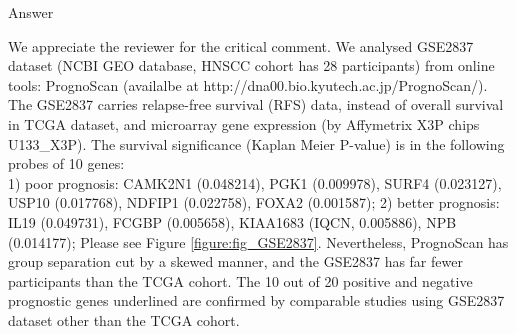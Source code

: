 \documentclass[preprint,12pt]{elsarticle}
\newenvironment{MyColorPar}[1]{%
    \leavevmode\color{#1}\ignorespaces%
}{%
}%
\begin{document}
\begin{MyColorPar}{blue}
Answer

We appreciate the reviewer for the critical comment.
We analysed GSE2837 dataset (NCBI GEO database\cite{Chung2006}, HNSCC cohort has 28 participants) from online tools: PrognoScan (availalbe at http://dna00.bio.kyutech.ac.jp/PrognoScan/)\cite{Mizuno2009a}.
The GSE2837 carries
relapse-free survival (RFS) data, instead of overall survival in TCGA dataset,
and microarray gene expression (by Affymetrix X3P chips U133\_X3P).
The survival significance (Kaplan Meier P-value) is in the following probes of 10 genes:\\
1) poor prognosis: CAMK2N1 (0.048214), PGK1 (0.009978), SURF4 (0.023127), USP10 (0.017768), NDFIP1 (0.022758), FOXA2 (0.001587); %
2) better prognosis: IL19 (0.049731), FCGBP (0.005658), KIAA1683 (IQCN, 0.005886), NPB (0.014177);
Please see Figure \ref{figure:fig_GSE2837}.
Nevertheless, PrognoScan has group separation cut by a skewed manner, and the GSE2837 has far fewer participants than the TCGA cohort.
The 10 out of 20 positive and negative prognostic genes underlined are confirmed by comparable studies using GSE2837 dataset other than the TCGA cohort.


\end{MyColorPar}
\end{document}
